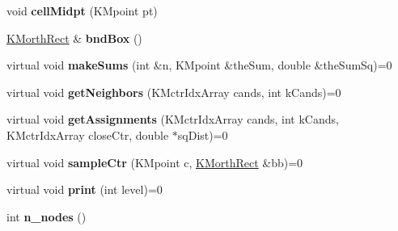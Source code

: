 \begin{DoxyCompactItemize}
\item 
\hypertarget{class_k_cnode_a5b5773ce288b6c74672f3cf69680a641}{
void {\bfseries cellMidpt} (KMpoint pt)}
\label{class_k_cnode_a5b5773ce288b6c74672f3cf69680a641}

\item 
\hypertarget{class_k_cnode_a2b34a6aa625295007d8d22589bace1ea}{
\hyperlink{class_k_morth_rect}{KMorthRect} \& {\bfseries bndBox} ()}
\label{class_k_cnode_a2b34a6aa625295007d8d22589bace1ea}

\item 
\hypertarget{class_k_cnode_a15c8f4f8d55f8c25fceecfba37ab3dc2}{
virtual void {\bfseries makeSums} (int \&n, KMpoint \&theSum, double \&theSumSq)=0}
\label{class_k_cnode_a15c8f4f8d55f8c25fceecfba37ab3dc2}

\item 
\hypertarget{class_k_cnode_a54edaaee5ac961b2544bddff41e4ebdb}{
virtual void {\bfseries getNeighbors} (KMctrIdxArray cands, int kCands)=0}
\label{class_k_cnode_a54edaaee5ac961b2544bddff41e4ebdb}

\item 
\hypertarget{class_k_cnode_a5fb6ad1afd76a4139ea7c29c0948e115}{
virtual void {\bfseries getAssignments} (KMctrIdxArray cands, int kCands, KMctrIdxArray closeCtr, double $\ast$sqDist)=0}
\label{class_k_cnode_a5fb6ad1afd76a4139ea7c29c0948e115}

\item 
\hypertarget{class_k_cnode_ab2cdcff0393586c4abd13396d118195f}{
virtual void {\bfseries sampleCtr} (KMpoint c, \hyperlink{class_k_morth_rect}{KMorthRect} \&bb)=0}
\label{class_k_cnode_ab2cdcff0393586c4abd13396d118195f}

\item 
\hypertarget{class_k_cnode_ab98ac20f92985bb47fad751f422b8cbb}{
virtual void {\bfseries print} (int level)=0}
\label{class_k_cnode_ab98ac20f92985bb47fad751f422b8cbb}

\item 
\hypertarget{class_k_cnode_af54654f803bbd48b66a5298c1edbe519}{
int {\bfseries n\_\-nodes} ()}
\label{class_k_cnode_af54654f803bbd48b66a5298c1edbe519}

\end{DoxyCompactItemize}
